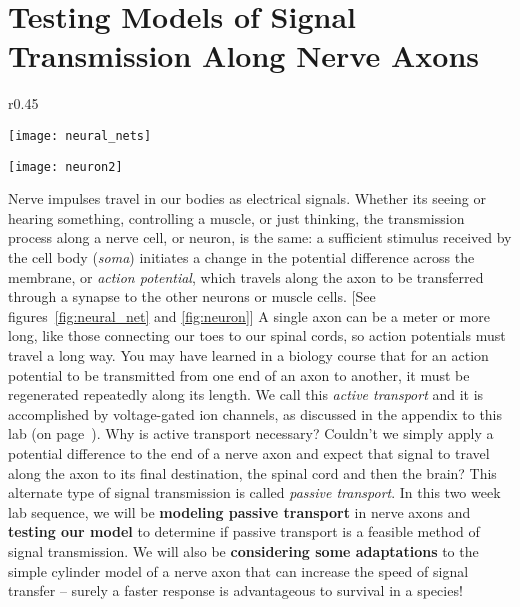 \chapter{Testing Models of Signal Transmission Along Nerve Axons}
\thispagestyle{fancy}

\begin{wrapfigure}{r}{0.45\textwidth}
  \vspace{-25pt}  
  \begin{center}
  \texttt{[image: neural\_nets]}
  \end{center}
  \caption{Neurons form networks for information flow.}
  \label{fig:neural_net}
  \vspace{45pt}
  \begin{center}
  \texttt{[image: neuron2]}
  \end{center}
  \caption{Information flow through neurons.}
  \label{fig:neuron}
  \vspace{0pt}
\end{wrapfigure}

Nerve impulses travel in our bodies as electrical signals. 
Whether its seeing or hearing something, controlling a muscle, or just thinking, the transmission process along a nerve cell, or neuron, is the same: a sufficient stimulus received by the cell body (\emph{soma}) initiates a change in the potential difference across the membrane, or \emph{action potential}, which travels along the axon to be transferred through a synapse to the other neurons or muscle cells. 
[See figures~\ref{fig:neural_net} and \ref{fig:neuron}]
A single axon can be a meter or more long, like those connecting our toes to our spinal cords, so action potentials must travel a long way.
You may have learned in a biology course that for an action potential to be transmitted from one end of an axon to another, it must be regenerated repeatedly along its length.
We call this \emph{active transport} and it is accomplished by voltage-gated ion channels, as discussed in the appendix to this lab (on page~\pageref{lab8appendix}).
Why is active transport necessary?
Couldn't we simply apply a potential difference to the end of a nerve axon and expect that signal to travel along the axon to its final destination, the spinal cord and then the brain?
This alternate type of signal transmission is called \emph{passive transport}. 
In this two week lab sequence, we will be \textbf{modeling passive transport} in nerve axons and \textbf{testing our model} to determine if passive transport is a feasible method of signal transmission. 
We will also be \textbf{considering some adaptations} to the simple cylinder model of a nerve axon that can increase the speed of signal transfer – surely a faster response is advantageous to survival in a species!

